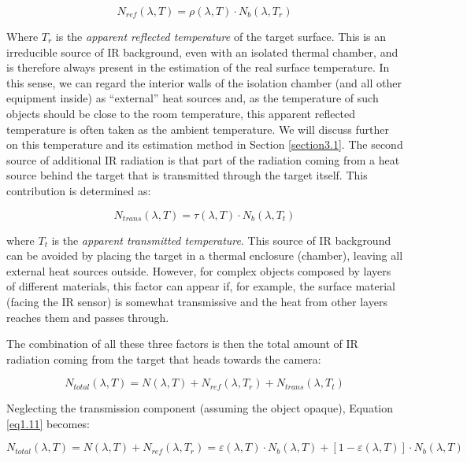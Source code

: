 		\begin{equation}\label{eq1.9}
			N_{ref}(\lambda,T)=\rho(\lambda,T) \cdot N_{b}(\lambda, T_{r})
		\end{equation}\bigskip
		
		Where $T_{r}$ is the \textit{apparent reflected temperature} of the target surface. This is an irreducible source of IR background, even with an isolated thermal chamber, and is therefore always present in the estimation of the real surface temperature. In this sense, we can regard the interior walls of the isolation chamber (and all other equipment inside) as “external” heat sources and, as the temperature of such objects should be close to the room temperature, this apparent reflected temperature is often taken as the ambient temperature. We will discuss further on this temperature and its estimation method in Section \ref{section3.1}. The second source of additional IR radiation is that part of the radiation coming from a heat source behind the target that is transmitted through the target itself. This contribution is determined as:
		
		\begin{equation}\label{eq1.10}
			N_{trans}(\lambda,T)=\tau(\lambda,T) \cdot N_{b}(\lambda, T_{t})
		\end{equation}\bigskip	
		
		where $T_{t}$ is the \textit{apparent transmitted temperature}. This source of IR background can be avoided by placing the target in a thermal enclosure (chamber), leaving all external heat sources outside. However, for complex objects composed by layers of different materials, this factor can appear if, for example, the surface material (facing the IR sensor) is somewhat transmissive and the heat from other layers reaches them and passes through.
		
		The combination of all these three factors is then the total amount of IR radiation coming from the target that heads towards the camera:
		
		\begin{equation}\label{eq1.11}
			N_{total}(\lambda,T)=N(\lambda,T)+N_{ref}(\lambda,T_{r})+N_{trans}(\lambda,T_{t})
		\end{equation}\bigskip
		
		Neglecting the transmission component (assuming the object opaque), Equation \ref{eq1.11} becomes:
		
		\begin{equation}\label{eq1.11a}
		N_{total}(\lambda,T)=N(\lambda,T)+N_{ref}(\lambda,T_{r})=\varepsilon(\lambda,T) \cdot N_{b}(\lambda, T)+[1-\varepsilon(\lambda,T)] \cdot N_{b}(\lambda, T)
		\end{equation}\bigskip
		

